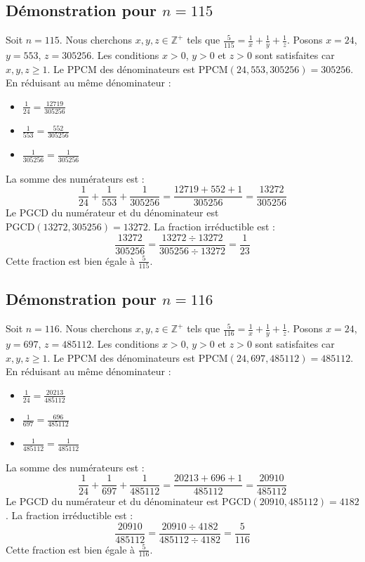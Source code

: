 \documentclass[11pt,a4paper]{article}
\begin{document}
\subsection{Démonstration pour $n = 115$}
Soit $n = 115$. Nous cherchons $x, y, z \in \mathbb{Z}^{+}$ tels que $\frac{5}{115} = \frac{1}{x} + \frac{1}{y} + \frac{1}{z}$.
Posons $x = 24$, $y = 553$, $z = 305256$.
Les conditions $x > 0$, $y > 0$ et $z > 0$ sont satisfaites car $x, y, z \geq 1$.
Le PPCM des dénominateurs est $\text{PPCM}(24, 553, 305256) = 305256$.
En réduisant au même dénominateur :
\begin{itemize}
    \item $\frac{1}{24} = \frac{12719}{305256}$
    \item $\frac{1}{553} = \frac{552}{305256}$
    \item $\frac{1}{305256} = \frac{1}{305256}$
\end{itemize}
La somme des numérateurs est :
$$ \frac{1}{24} + \frac{1}{553} + \frac{1}{305256} = \frac{12719 + 552 + 1}{305256} = \frac{13272}{305256} $$
Le PGCD du numérateur et du dénominateur est $\text{PGCD}(13272, 305256) = 13272$.
La fraction irréductible est :
$$ \frac{13272}{305256} = \frac{13272 \div 13272}{305256 \div 13272} = \frac{1}{23} $$
Cette fraction est bien égale à $\frac{5}{115}$.

\subsection{Démonstration pour $n = 116$}
Soit $n = 116$. Nous cherchons $x, y, z \in \mathbb{Z}^{+}$ tels que $\frac{5}{116} = \frac{1}{x} + \frac{1}{y} + \frac{1}{z}$.
Posons $x = 24$, $y = 697$, $z = 485112$.
Les conditions $x > 0$, $y > 0$ et $z > 0$ sont satisfaites car $x, y, z \geq 1$.
Le PPCM des dénominateurs est $\text{PPCM}(24, 697, 485112) = 485112$.
En réduisant au même dénominateur :
\begin{itemize}
    \item $\frac{1}{24} = \frac{20213}{485112}$
    \item $\frac{1}{697} = \frac{696}{485112}$
    \item $\frac{1}{485112} = \frac{1}{485112}$
\end{itemize}
La somme des numérateurs est :
$$ \frac{1}{24} + \frac{1}{697} + \frac{1}{485112} = \frac{20213 + 696 + 1}{485112} = \frac{20910}{485112} $$
Le PGCD du numérateur et du dénominateur est $\text{PGCD}(20910, 485112) = 4182$.
La fraction irréductible est :
$$ \frac{20910}{485112} = \frac{20910 \div 4182}{485112 \div 4182} = \frac{5}{116} $$
Cette fraction est bien égale à $\frac{5}{116}$.
\end{document}
